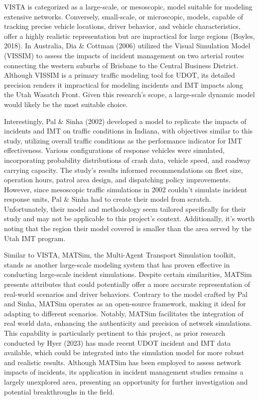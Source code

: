 \documentclass[fancy, oneside, mastersfancy, ms]{byuthesis}
\begin{document}
VISTA is categorized as a large-scale, or mesoscopic, model suitable for
modeling extensive networks. Conversely, small-scale, or microscopic,
models, capable of tracking precise vehicle locations, driver behavior,
and vehicle characteristics, offer a highly realistic representation but
are impractical for large regions (Boyles, 2018). In Australia, Dia \&
Cottman (2006) utilized the Visual Simulation Model (VISSIM) to assess
the impacts of incident management on two arterial routes connecting the
western suburbs of Brisbane to the Central Business District. Although
VISSIM is a primary traffic modeling tool for UDOT, its detailed
precision renders it impractical for modeling incidents and IMT impacts
along the Utah Wasatch Front. Given this research's scope, a large-scale
dynamic model would likely be the most suitable choice.

Interestingly, Pal \& Sinha (2002) developed a model to replicate the
impacts of incidents and IMT on traffic conditions in Indiana, with
objectives similar to this study, utilizing overall traffic conditions
as the performance indicator for IMT effectiveness. Various
configurations of response vehicles were simulated, incorporating
probability distributions of crash data, vehicle speed, and roadway
carrying capacity. The study's results informed recommendations on fleet
size, operation hours, patrol area design, and dispatching policy
improvements. However, since mesoscopic traffic simulations in 2002
couldn't simulate incident response units, Pal \& Sinha had to create
their model from scratch. Unfortunately, their model and methodology
seem tailored specifically for their study and may not be applicable to
this project's context. Additionally, it's worth noting that the region
their model covered is smaller than the area served by the Utah IMT
program.

Similar to VISTA, MATSim, the Multi-Agent Transport Simulation toolkit,
stands as another large-scale modeling system that has proven effective
in conducting large-scale incident simulations. Despite certain
similarities, MATSim presents attributes that could potentially offer a
more accurate representation of real-world scenarios and driver
behaviors. Contrary to the model crafted by Pal and Sinha, MATSim
operates as an open-source framework, making it ideal for adapting to
different scenarios. Notably, MATSim facilitates the integration of real
world data, enhancing the authenticity and precision of network
simulations. This capability is particularly pertinent to this project,
as prior research conducted by Hyer (2023) has made recent UDOT incident
and IMT data available, which could be integrated into the simulation
model for more robust and realistic results. Although MATSim has been
employed to assess network impacts of incidents, its application in
incident management studies remains a largely unexplored area,
presenting an opportunity for further investigation and potential
breakthroughs in the field.
\end{document}
